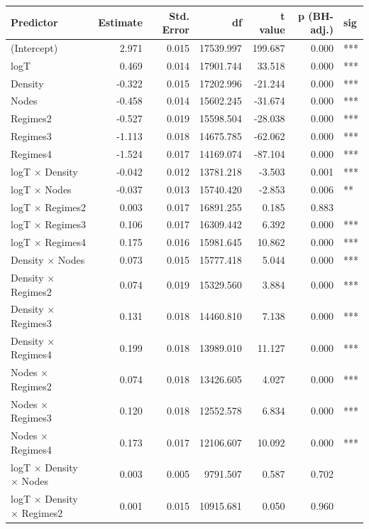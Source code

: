 \begin{table}[ht]
\centering
\begin{tabular}{lrrrrrl}
  \hline
Predictor & Estimate & Std. Error & df & t value & p (BH-adj.) & sig \\ 
  \hline
(Intercept) & 2.971 & 0.015 & 17539.997 & 199.687 & 0.000 & *** \\ 
  logT & 0.469 & 0.014 & 17901.744 & 33.518 & 0.000 & *** \\ 
  Density & -0.322 & 0.015 & 17202.996 & -21.244 & 0.000 & *** \\ 
  Nodes & -0.458 & 0.014 & 15602.245 & -31.674 & 0.000 & *** \\ 
  Regimes2 & -0.527 & 0.019 & 15598.504 & -28.038 & 0.000 & *** \\ 
  Regimes3 & -1.113 & 0.018 & 14675.785 & -62.062 & 0.000 & *** \\ 
  Regimes4 & -1.524 & 0.017 & 14169.074 & -87.104 & 0.000 & *** \\ 
  logT × Density & -0.042 & 0.012 & 13781.218 & -3.503 & 0.001 & *** \\ 
  logT × Nodes & -0.037 & 0.013 & 15740.420 & -2.853 & 0.006 & ** \\ 
  logT × Regimes2 & 0.003 & 0.017 & 16891.255 & 0.185 & 0.883 &  \\ 
  logT × Regimes3 & 0.106 & 0.017 & 16309.442 & 6.392 & 0.000 & *** \\ 
  logT × Regimes4 & 0.175 & 0.016 & 15981.645 & 10.862 & 0.000 & *** \\ 
  Density × Nodes & 0.073 & 0.015 & 15777.418 & 5.044 & 0.000 & *** \\ 
  Density × Regimes2 & 0.074 & 0.019 & 15329.560 & 3.884 & 0.000 & *** \\ 
  Density × Regimes3 & 0.131 & 0.018 & 14460.810 & 7.138 & 0.000 & *** \\ 
  Density × Regimes4 & 0.199 & 0.018 & 13989.010 & 11.127 & 0.000 & *** \\ 
  Nodes × Regimes2 & 0.074 & 0.018 & 13426.605 & 4.027 & 0.000 & *** \\ 
  Nodes × Regimes3 & 0.120 & 0.018 & 12552.578 & 6.834 & 0.000 & *** \\ 
  Nodes × Regimes4 & 0.173 & 0.017 & 12106.607 & 10.092 & 0.000 & *** \\ 
  logT × Density × Nodes & 0.003 & 0.005 & 9791.507 & 0.587 & 0.702 &  \\ 
  logT × Density × Regimes2 & 0.001 & 0.015 & 10915.681 & 0.050 & 0.960 &  \\ 

\end{tabular}
\end{table}
